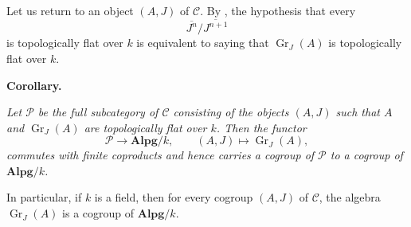 Let us return to an object \((A,J)\) of \(\mathcal C\). By
, the hypothesis that every
\[
  \overline{J^n}/\overline{J^{n+1}}
\]
is topologically flat over \(k\) is equivalent to saying that
\(\operatorname{Gr}_J(A)\) is topologically flat over \(k\).

\medskip
\noindent\textbf{Corollary.}
\label{sga3:VIIB:5.1.2:corollary}
{\itshape Let \(\mathcal P\) be the full subcategory of
\(\mathcal C\) consisting of the objects \((A,J)\) such that
\(A\) and \(\operatorname{Gr}_J(A)\) are topologically flat over
\(k\). Then the functor
\[
  \mathcal P\longrightarrow\mathbf{Alpg}/k,
  \qquad
  (A,J)\longmapsto\operatorname{Gr}_J(A),
\]
commutes with finite coproducts and hence carries a cogroup of
\(\mathcal P\) to a cogroup of \(\mathbf{Alpg}/k\).

In particular, if \(k\) is a field, then for every cogroup
\((A,J)\) of \(\mathcal C\), the algebra
\(\operatorname{Gr}_J(A)\) is a cogroup of
\(\mathbf{Alpg}/k\).}
